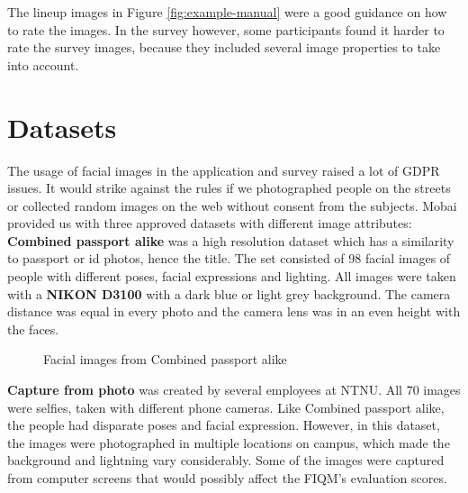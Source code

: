 The lineup images in Figure \ref{fig:example-manual} were a good guidance on how to rate the images. In the survey however, some participants found it harder to rate the survey images, because they included several image properties to take into account. 

\section{Datasets}
\label{sec:datasets}
The usage of facial images in the application and survey raised a lot of GDPR issues. It would strike against the rules if we photographed people on the streets or collected random images on the web without consent from the subjects. Mobai provided us with three approved datasets with different image attributes: \textbf{Combined passport alike} was a high resolution dataset which has a similarity to passport or id photos, hence the title. The set consisted of 98 facial images of people with different poses, facial expressions and lighting. All images were taken with a \textbf{NIKON D3100} with a dark blue or light grey background. The camera distance was equal in every photo and the camera lens was in an even height with the faces. 
\begin{figure}[h]
    \centering
    \qquad
    \caption{Facial images from Combined passport alike}
    \label{fig:combined_passport_alike}
\end{figure}
\newpage
\noindent
\textbf{Capture from photo} was created by several employees at NTNU. All 70 images were selfies, taken with different phone cameras. Like Combined passport alike, the people had disparate poses and facial expression. However, in this dataset, the images were photographed in multiple locations on campus, which made the background and lightning vary considerably. Some of the images were captured from computer screens that would possibly affect the FIQM's evaluation scores. 

